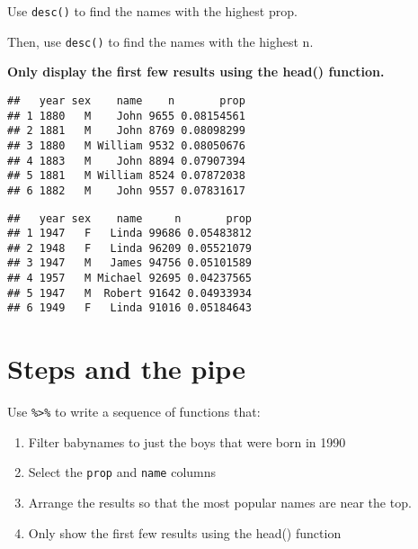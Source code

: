 \documentclass[
]{article}
\newenvironment{Shaded}{\begin{snugshade}}{\end{snugshade}}
\newcommand{\KeywordTok}[1]{\textcolor[rgb]{0.13,0.29,0.53}{\textbf{#1}}}
\newcommand{\NormalTok}[1]{#1}
\newcommand{\OperatorTok}[1]{\textcolor[rgb]{0.81,0.36,0.00}{\textbf{#1}}}
\newcommand{\StringTok}[1]{\textcolor[rgb]{0.31,0.60,0.02}{#1}}
\providecommand{\tightlist}{%
  \setlength{\itemsep}{0pt}\setlength{\parskip}{0pt}}
\begin{document}
Use \texttt{desc()} to find the names with the highest prop.

Then, use \texttt{desc()} to find the names with the highest n.

\textbf{Only display the first few results using the head() function.}

\begin{Shaded}
\end{Shaded}

\begin{verbatim}
##   year sex    name    n       prop
## 1 1880   M    John 9655 0.08154561
## 2 1881   M    John 8769 0.08098299
## 3 1880   M William 9532 0.08050676
## 4 1883   M    John 8894 0.07907394
## 5 1881   M William 8524 0.07872038
## 6 1882   M    John 9557 0.07831617
\end{verbatim}

\begin{Shaded}
\end{Shaded}

\begin{verbatim}
##   year sex    name     n       prop
## 1 1947   F   Linda 99686 0.05483812
## 2 1948   F   Linda 96209 0.05521079
## 3 1947   M   James 94756 0.05101589
## 4 1957   M Michael 92695 0.04237565
## 5 1947   M  Robert 91642 0.04933934
## 6 1949   F   Linda 91016 0.05184643
\end{verbatim}

\hypertarget{steps-and-the-pipe}{%
\section{Steps and the pipe}\label{steps-and-the-pipe}}

Use \texttt{\%\textgreater{}\%} to write a sequence of functions that:

\begin{enumerate}
\def\labelenumi{\arabic{enumi}.}
\tightlist
\item
  Filter babynames to just the boys that were born in 1990\\
\item
  Select the \texttt{prop} and \texttt{name} columns\\
\item
  Arrange the results so that the most popular names are near the top.
\item
  Only show the first few results using the head() function
\end{enumerate}
\end{document}

